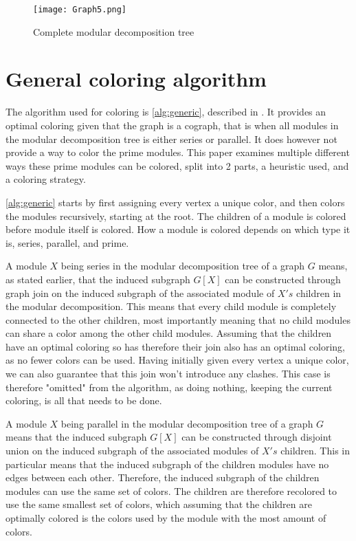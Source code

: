 \documentclass[a4paper]{article}
\begin{document}
\begin{figure}[h!]
    \texttt{[image: Graph5.png]}
    \caption{Complete modular decomposition tree}
    \label{fig:graph5}
\end{figure}

\FloatBarrier

\section{General coloring algorithm}

The algorithm used for coloring is \autoref{alg:generic}, described in
\cite{HCL}. It provides an optimal coloring given that the graph is a cograph,
that is when all modules in the modular decomposition tree is either series or
parallel.  It does however not provide a way to color the prime modules. This
paper examines multiple different ways these prime modules can be colored, split
into 2 parts, a heuristic used, and a coloring strategy. 

\autoref{alg:generic} starts by first assigning every vertex a unique color,
and then colors the modules recursively, starting at the root. The children of a
module is colored before module itself is colored. How a module is colored depends 
on which type it is, series, parallel, and prime.

A module $X$ being series in the modular decomposition tree of a graph $G$
means, as stated earlier, that the induced subgraph $G[X]$ can be constructed
through graph join on the induced subgraph of the associated module of $X's$
children in the modular decomposition. This means that every child module is
completely connected to the other children, most importantly meaning that no
child modules can share a color among the other child modules. Assuming that
the children have an optimal coloring so has therefore their join also has an optimal
coloring, as no fewer colors can be used. Having initially given every vertex a
unique color, we can also guarantee that this join won't introduce any clashes.
This case is therefore "omitted" from the algorithm, as doing nothing, keeping
the current coloring, is all that needs to be done.

A module $X$ being parallel in the modular decomposition tree of a graph $G$ means that
the induced subgraph $G[X]$ can be constructed through disjoint union on the induced
subgraph of the associated modules of $X's$ children. This in particular means that 
the induced subgraph of the children modules have no edges between each other. Therefore,
the induced subgraph of the children modules can use the same set of colors. The children
are therefore recolored to use the same smallest set of colors, 
which assuming that the children are optimally colored is the colors used by the module 
with the most amount of colors.
\end{document}
